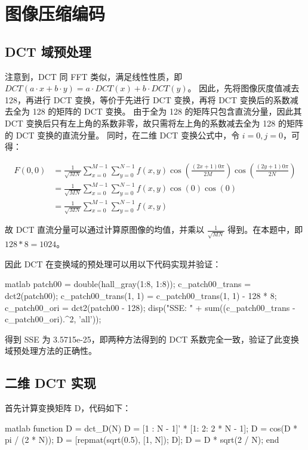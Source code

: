 \documentclass[a4paper]{article}  %
\begin{document}
\section{图像压缩编码}

\subsection{DCT 域预处理}

注意到，DCT 同 FFT 类似，满足线性性质，即 $DCT(a \cdot x + b \cdot y) = a \cdot DCT(x) + b \cdot DCT(y)$。
因此，先将图像灰度值减去 128，再进行 DCT 变换，等价于先进行 DCT 变换，再将 DCT 变换后的系数减去全为 128 的矩阵的 DCT 变换。
由于全为 128 的矩阵只包含直流分量，因此其 DCT 变换后只有左上角的系数非零，故只需将左上角的系数减去全为 128 的矩阵的 DCT 变换的直流分量。
同时，在二维 DCT 变换公式中，令 $i=0, j=0$，可得：

\begin{align*}
    F(0, 0) &= \frac{1}{\sqrt{MN}} \sum_{x=0}^{M-1} \sum_{y=0}^{N-1} f(x, y) \cos\left(\frac{(2x+1)0\pi}{2M}\right) \cos\left(\frac{(2y+1)0\pi}{2N}\right) \\
    &= \frac{1}{\sqrt{MN}} \sum_{x=0}^{M-1} \sum_{y=0}^{N-1} f(x, y) \cos(0) \cos(0) \\
    &= \frac{1}{\sqrt{MN}} \sum_{x=0}^{M-1} \sum_{y=0}^{N-1} f(x, y)
\end{align*}

故 DCT 直流分量可以通过计算原图像的均值，并乘以 $\frac{1}{\sqrt{MN}}$ 得到。在本题中，即 $128 * 8 = 1024$。

因此 DCT 在变换域的预处理可以用以下代码实现并验证：

\begin{codeblock}{matlab}
    patch00 = double(hall_gray(1:8, 1:8));
    c_patch00_trans = dct2(patch00);
    c_patch00_trans(1, 1) = c_patch00_trans(1, 1) - 128 * 8;
    c_patch00_ori = dct2(patch00 - 128);
    disp("SSE: " + sum((c_patch00_trans - c_patch00_ori).^2, 'all'));
\end{codeblock}

得到 SSE 为 3.5715e-25，即两种方法得到的 DCT 系数完全一致，验证了此变换域预处理方法的正确性。

\subsection{二维 DCT 实现}

首先计算变换矩阵 D，代码如下：

\begin{codeblock}{matlab}
function D = dct_D(N)
    D = [1 : N - 1]' * [1: 2: 2 * N - 1];
    D = cos(D * pi / (2 * N));
    D = [repmat(sqrt(0.5), [1, N]); D];
    D = D * sqrt(2 / N);
end
\end{codeblock}
\end{document}
